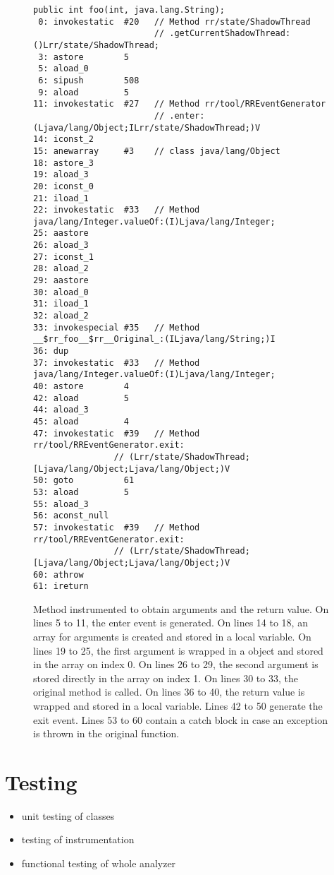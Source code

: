 \begin{figure}[hbt]
    \label{paramInst}
    \begin{lstlisting}
public int foo(int, java.lang.String);
 0: invokestatic  #20   // Method rr/state/ShadowThread
                        // .getCurrentShadowThread:()Lrr/state/ShadowThread;
 3: astore        5
 5: aload_0
 6: sipush        508
 9: aload         5
11: invokestatic  #27   // Method rr/tool/RREventGenerator
                        // .enter:(Ljava/lang/Object;ILrr/state/ShadowThread;)V
14: iconst_2
15: anewarray     #3    // class java/lang/Object
18: astore_3
19: aload_3
20: iconst_0
21: iload_1
22: invokestatic  #33   // Method java/lang/Integer.valueOf:(I)Ljava/lang/Integer;
25: aastore
26: aload_3
27: iconst_1
28: aload_2
29: aastore
30: aload_0
31: iload_1
32: aload_2
33: invokespecial #35   // Method __$rr_foo__$rr__Original_:(ILjava/lang/String;)I
36: dup
37: invokestatic  #33   // Method java/lang/Integer.valueOf:(I)Ljava/lang/Integer;
40: astore        4
42: aload         5
44: aload_3
45: aload         4
47: invokestatic  #39   // Method rr/tool/RREventGenerator.exit:
                // (Lrr/state/ShadowThread;[Ljava/lang/Object;Ljava/lang/Object;)V
50: goto          61
53: aload         5
55: aload_3
56: aconst_null
57: invokestatic  #39   // Method rr/tool/RREventGenerator.exit:
                // (Lrr/state/ShadowThread;[Ljava/lang/Object;Ljava/lang/Object;)V
60: athrow
61: ireturn\end{lstlisting}
    \caption{Method instrumented to obtain arguments and the return value. On
    lines 5 to 11, the enter event is generated. On lines 14 to 18, an array for
    arguments is created and stored in a local variable. On lines 19 to 25, the
    first argument is wrapped in a object and stored in the array on index 0. On
    lines 26 to 29, the second argument is stored directly in the array on index
    1. On lines 30 to 33, the original method is called. On lines 36 to 40, the
    return value is wrapped and stored in a local variable. Lines 42 to 50
    generate the exit event. Lines 53 to 60 contain a catch block in case an
    exception is thrown in the original function.}
\end{figure}

\section{Testing}
\begin{itemize}
    \item unit testing of classes
    \item testing of instrumentation
    \item functional testing of whole analyzer
\end{itemize}
{\color{blue}\lipsum[1-4]}



